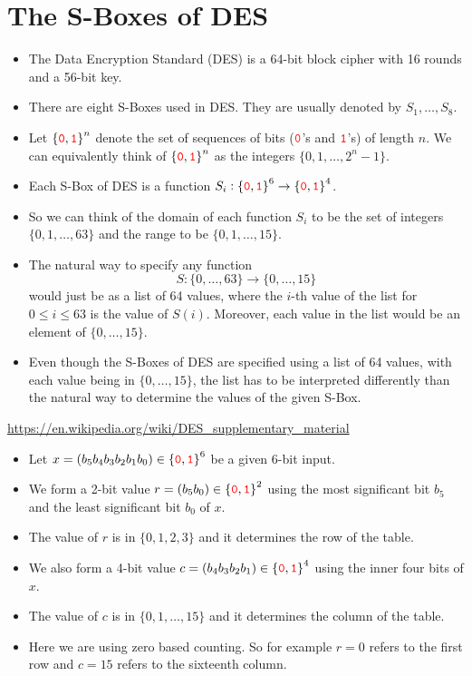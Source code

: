 \section{The S-Boxes of DES}\begin{itemize}
	\item The Data Encryption Standard (DES) is a 64-bit block cipher with 16 rounds and a 56-bit key.
	\item There are eight S-Boxes used in DES. They are usually denoted by $S_1, \ldots, S_8$.
	\item Let $\set{\textcolor{red}{\texttt{0}},\textcolor{red}{\texttt{1}}}^n$ denote the set of sequences of bits ($\textcolor{red}{\texttt{0}}$'s and $\textcolor{red}{\texttt{1}}$'s) of length $n$. We can equivalently think of $\set{\textcolor{red}{\texttt{0}},\textcolor{red}{\texttt{1}}}^n$ as the integers $\{0, 1, \ldots, 2^n - 1\}$.
	\item Each S-Box of DES is a function $S_i : \set{\textcolor{red}{\texttt{0}},\textcolor{red}{\texttt{1}}}^6 \rightarrow \set{\textcolor{red}{\texttt{0}},\textcolor{red}{\texttt{1}}}^4$.
	\item So we can think of the domain of each function $S_i$ to be the set of integers $\{0, 1, \ldots, 63\}$ and the range to be $\{0, 1, \ldots, 15\}$.
\end{itemize}

\begin{itemize}
	\item The natural way to specify any function 
	\[S : \{0, \ldots, 63\} \rightarrow \{0, \ldots, 15\}\]
	would just be as a list of 64 values, where the $i$-th value of the list for $0 \leq i \leq 63$ is the value of $S(i)$. Moreover, each value in the list would be an element of $\{0, \ldots, 15\}$.
	\item Even though the S-Boxes of DES are specified using a list of 64 values, with each value being in $\{0, \ldots, 15\}$, the list has to be interpreted differently than the natural way to determine the values of the given S-Box.
\end{itemize}

\url{https://en.wikipedia.org/wiki/DES_supplementary_material}

\begin{itemize}
	\item Let $x = (b_5b_4b_3b_2b_1b_0) \in \set{\textcolor{red}{\texttt{0}},\textcolor{red}{\texttt{1}}}^6$ be a given 6-bit input.
	\item We form a 2-bit value $r = (b_5b_0) \in \set{\textcolor{red}{\texttt{0}},\textcolor{red}{\texttt{1}}}^2$ using the most significant bit $b_5$ and the least significant bit $b_0$ of $x$.
	\item The value of $r$ is in $\{0, 1, 2, 3\}$ and it determines the row of the table.
	\item We also form a 4-bit value $c = (b_4b_3b_2b_1) \in \set{\textcolor{red}{\texttt{0}},\textcolor{red}{\texttt{1}}}^4$ using the inner four bits of $x$.
	\item The value of $c$ is in $\{0, 1, \ldots, 15\}$ and it determines the column of the table.
	\item Here we are using zero based counting. So for example $r = 0$ refers to the first row and $c = 15$ refers to the sixteenth column.
\end{itemize}

